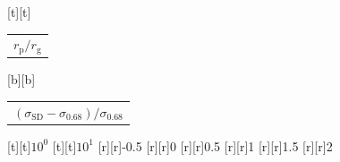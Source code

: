 %    
%
%
\begin{psfrags}%
\psfragscanon%
%
[t][t]{\color[rgb]{0,0,0}\setlength{\tabcolsep}{0pt}\begin{tabular}{c}{\Large$r_\mathrm{p}/r_\mathrm{g}$}\end{tabular}}%
[b][b]{\color[rgb]{0,0,0}\setlength{\tabcolsep}{0pt}\begin{tabular}{c}{\Large$(\sigma_\mathrm{SD}-\sigma_{0.68})/\sigma_{0.68}$}\end{tabular}}%
%
[t][t]{$10^{0}$}%
[t][t]{$10^{1}$}%
%
[r][r]{-0.5}%
[r][r]{0}%
[r][r]{0.5}%
[r][r]{1}%
[r][r]{1.5}%
[r][r]{2}%
%
%
\end{psfrags}%
%
